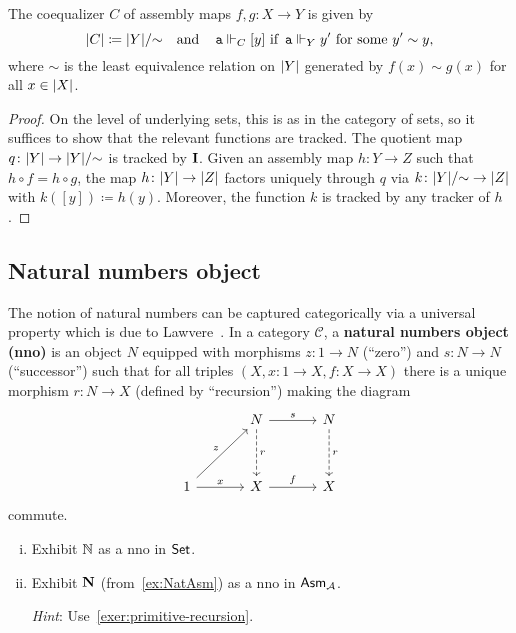 \begin{proposition}[Coequalizers]
  The coequalizer \(C\) of assembly maps \(f,g \colon X \to Y\) is given by
  \[
    \lvert C\rvert \coloneq \lvert Y\rvert/{\sim}
    \quad\text{and}\quad
    \operatorname{\mathtt{a}} \Vdash_C [y] \text{ if } \operatorname{\mathtt{a}} \Vdash_Y y'
    \text{ for some } {y'} \sim y,
  \]
  where \({\sim}\) is the least equivalence relation on \(\lvert Y\rvert\)
  generated by \(f(x) \sim g(x)\) for all \(x \in \lvert X\rvert\).
\end{proposition}
\begin{proof}
  On the level of underlying sets, this is as in the category of sets, so it
  suffices to show that the relevant functions are tracked.
  The quotient map \(q \colon \lvert Y\rvert \to \lvert Y\rvert/{\sim}\) is tracked by
  \(\operatorname{\mathbf{I}}\).
  Given an assembly map \(h \colon Y \to Z\) such that
  \(h \circ f = h \circ g\), the map \(h \colon \lvert Y\rvert \to \lvert Z\rvert\)
  factors uniquely through \(q\) via
  \(k \colon \lvert Y\rvert/{\sim} \to \lvert Z\rvert\) with \(k([y]) \coloneq h(y)\).
  Moreover, the function \(k\) is tracked by any tracker of \(h\).
\end{proof}

\subsection{Natural numbers object}
The notion of natural numbers can be captured categorically via a universal
property which is due to Lawvere~\cite{Lawvere1963}. In a category
\(\mathcal C\), a \textbf{natural numbers object (nno)} is an object \(N\)
equipped with morphisms \(z \colon 1 \to N\) (``zero'') and \(s \colon N \to N\)
(``successor'') such that for all triples
\((X,x \colon 1 \to X,f\colon X \to X)\) there is a unique morphism
\(r \colon N \to X\) (defined by ``recursion'') making the diagram
\[
  \begin{tikzcd}[row sep=12mm,column sep=12mm]
    & N \ar[r,"s"] \ar[d,dashed,"r"] & N \ar[d,dashed,"r"] \\
    1 \ar[ur,"z"] \ar[r,"x"] & X \ar[r,"f"] & X
  \end{tikzcd}
\]
commute.

\begin{exercise}\label{exer:nno} \leavevmode
  \begin{enumerate}[(i)]
  \item Exhibit \(\mathbb N\) as a nno in \(\mathsf{Set}\).
  \item Exhibit \(\mathbf N\) (from~\cref{ex:NatAsm}) as a nno in \(\mathsf{Asm}_{\mathcal A}\).

    \emph{Hint}: Use~\cref{exer:primitive-recursion}.
  \end{enumerate}
\end{exercise}

